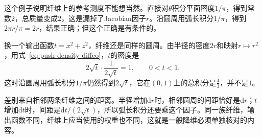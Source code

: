 这个例子说明纤维上的参考测度不能想当然。直接对$\theta$积分平面密度$1/\pi$，得到常数$2$，总质量变成$2$，这是漏掉了Jacobian因子$r$。沿圆周用弧长积分$1/\pi$，得到$2\pi r/\pi=2r$，结果正确；但这个正确是有条件的。

换一个输出函数$t=x^2+z^2$，纤维还是同样的圆周。由半径的密度$2r$和映射$r\mapsto r^2$，用式~\eqref{eq:push-density-diffeo}，$t$的密度是
\[
2\sqrt t\cdot\frac{1}{2\sqrt t}=1,\qquad0<t<1 .
\]
这时沿圆周用弧长积分$1/\pi$仍然得到$2\sqrt t$，它在$(0,1)$上的总积分是$\tfrac43$，并不是$1$。

差别来自相邻两条纤维之间的距离。半径增加$\mathrm dr$时，相邻圆周的间距恰好是$\mathrm dr$；$t$增加$\mathrm dt$时，间距是$\mathrm dt/(2\sqrt t)$，所以弧长积分还要乘这个因子。同一族纤维，输出函数不同，纤维上应当使用的权重也不同，这就是一般降维必须单独核对的内容。
